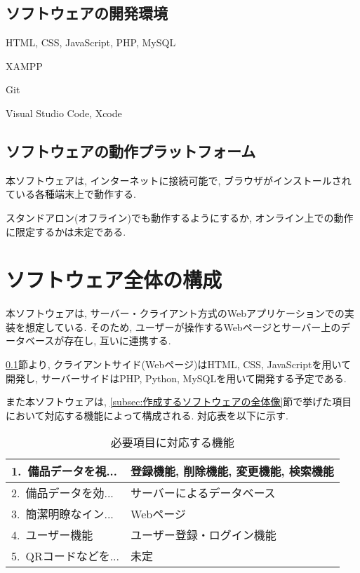 \documentclass[11ptm]{jsarticle}
\begin{document}
\subsection{ソフトウェアの開発環境}
\label{subsec:ソフトウェアの開発環境}
\begin{description}[labelwidth=9em]
  \item[使用言語] HTML, CSS, JavaScript, PHP, MySQL
  \item[使用フレームワーク] XAMPP
  \item[使用ミドルウェア] Git
  \item[使用開発環境] Visual Studio Code, Xcode
\end{description}

\subsection{ソフトウェアの動作プラットフォーム}
\label{subsec:ソフトウェアの動作プラットフォーム}
本ソフトウェアは, インターネットに接続可能で, ブラウザがインストールされている各種端末上で動作する. \par
スタンドアロン(オフライン)でも動作するようにするか, オンライン上での動作に限定するかは未定である. 


\newpage
\section{ソフトウェア全体の構成}
\label{sec:ソフトウェア全体の構成}
本ソフトウェアは, サーバー・クライアント方式のWebアプリケーションでの実装を想定している. そのため, ユーザーが操作するWebページとサーバー上のデータベースが存在し, 互いに連携する. \par
\ref{subsec:ソフトウェアの開発環境}節より, クライアントサイド(Webページ)はHTML, CSS, JavaScriptを用いて開発し, サーバーサイドはPHP, Python, MySQLを用いて開発する予定である. \par
また本ソフトウェアは, \ref{subsec:作成するソフトウェアの全体像}節で挙げた項目において対応する機能によって構成される. 対応表を以下に示す. 
\begin{table}[h]
  \caption{必要項目に対応する機能}
  \label{tb:必要項目に対応する機能}
  \centering
  \begin{tabularx}{\linewidth}{l|l}
    1.\ 備品データを視... & 登録機能, 削除機能, 変更機能, 検索機能 \\
    \hline
    2.\ 備品データを効... & サーバーによるデータベース \\
    \hline
    3.\ 簡潔明瞭なイン... & Webページ \\
    \hline
    4.\ ユーザー機能 & ユーザー登録・ログイン機能 \\
    \hline
    5.\ QRコードなどを... & 未定 \\
  \end{tabularx}
\end{table}
\end{document}
